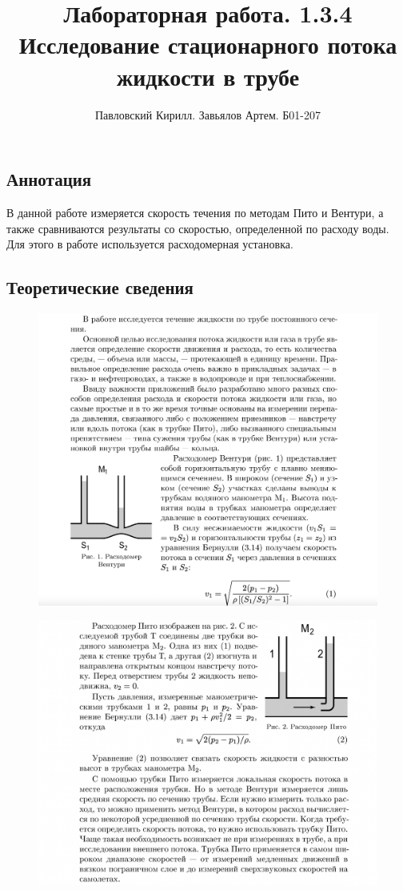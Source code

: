 \documentclass[a4paper,12pt]{article} %
\author{Павловский Кирилл. Завьялов Артем. Б01-207}
\title{\textbf{Лабораторная работа. 1.3.4\\ Исследование стационарного потока жидкости в трубе}}
\date{}
\begin{document}
\maketitle
\thispagestyle{empty}
\newpage

\subsection*{Аннотация}
В данной работе измеряется скорость течения по методам Пито и Вентури, а также сравниваются результаты со скоростью, определенной по расходу воды. Для этого в работе используется расходомерная установка.

\subsection*{Теоретические сведения}
\begin{figure} [h]
\centering\includegraphics[scale = 0.5]{Snimok_Ekrana_2023-06-11_V_13_40_21.png}
\end{figure}

\begin{figure} [h]
\centering\includegraphics[scale = 0.5]{Snimok_Ekrana_2023-06-11_V_13_41_45.png}
\end{figure}
\end{document}
